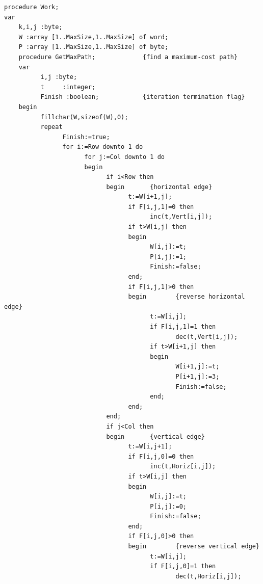 \documentclass[11pt]{article}
\begin{document}
\begin{verbatim}
procedure Work;
var
    k,i,j :byte;
    W :array [1..MaxSize,1..MaxSize] of word;
    P :array [1..MaxSize,1..MaxSize] of byte;
    procedure GetMaxPath;             {find a maximum-cost path}
    var
          i,j :byte;
          t     :integer;
          Finish :boolean;            {iteration termination flag}
    begin
          fillchar(W,sizeof(W),0);
          repeat
                Finish:=true;
                for i:=Row downto 1 do
                      for j:=Col downto 1 do
                      begin
                            if i<Row then
                            begin       {horizontal edge}
                                  t:=W[i+1,j];
                                  if F[i,j,1]=0 then
                                        inc(t,Vert[i,j]);
                                  if t>W[i,j] then
                                  begin
                                        W[i,j]:=t;
                                        P[i,j]:=1;
                                        Finish:=false;
                                  end;
                                  if F[i,j,1]>0 then
                                  begin        {reverse horizontal edge}
                                        t:=W[i,j];
                                        if F[i,j,1]=1 then
                                               dec(t,Vert[i,j]);
                                        if t>W[i+1,j] then
                                        begin
                                               W[i+1,j]:=t;
                                               P[i+1,j]:=3;
                                               Finish:=false;
                                        end;
                                  end;
                            end;
                            if j<Col then
                            begin       {vertical edge}
                                  t:=W[i,j+1];
                                  if F[i,j,0]=0 then
                                        inc(t,Horiz[i,j]);
                                  if t>W[i,j] then
                                  begin
                                        W[i,j]:=t;
                                        P[i,j]:=0;
                                        Finish:=false;
                                  end;
                                  if F[i,j,0]>0 then
                                  begin        {reverse vertical edge}
                                        t:=W[i,j];
                                        if F[i,j,0]=1 then
                                               dec(t,Horiz[i,j]);

\end{verbatim}
\end{document}
